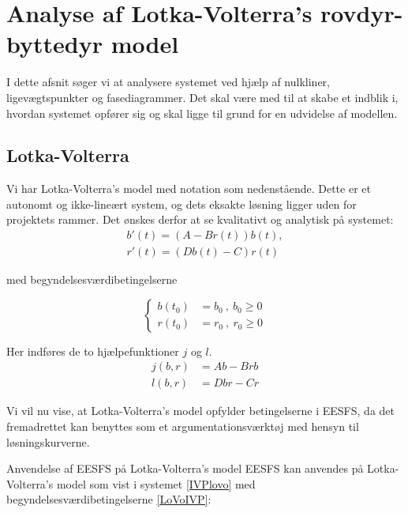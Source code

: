 \chapter{Analyse af Lotka-Volterra's rovdyr-byttedyr model}
I dette afsnit søger vi at analysere systemet ved hjælp af nulkliner, ligevægtspunkter og fasediagrammer. Det skal være med til at skabe et indblik i, hvordan systemet opfører sig og skal ligge til grund for en udvidelse af modellen.\\
\section{Lotka-Volterra}
Vi har Lotka-Volterra's model med notation som nedenstående. Dette er et autonomt og ikke-lineært system, og dets eksakte løsning ligger uden for projektets rammer. Det ønskes derfor at se kvalitativt og analytisk på systemet:
\begin{equation}
    \begin{aligned}
    b'(t) = (A-Br(t)) b(t),\\
    r'(t) = (Db(t)-C) r(t)
    \end{aligned}
    \label{IVPlovo}
\end{equation}

med begyndelsesværdibetingelserne

\begin{equation}\label{LoVoIVP}
    \begin{cases}
    b(t_0)&= b_0 \ , \ b_0\geq0\\
    r(t_0)&= r_0 \ , \ r_0\geq0
    \end{cases}
\end{equation}

Her indføres de to hjælpefunktioner $j$ og $l$. 
\begin{align}
    j(b,r) &= Ab - Brb\label{bytteh}\\
    l(b,r) &= Dbr - Cr
    \label{rovh}
\end{align}

Vi vil nu vise, at Lotka-Volterra's model opfylder betingelserne i EESFS, da det fremadrettet kan benyttes som et argumentationsværktøj med hensyn til løsningskurverne.
\begin{lemma}{Anvendelse af EESFS på Lotka-Volterra's model}{}
EESFS kan anvendes på Lotka-Volterra's model som vist i systemet \eqref{IVPlovo} med begyndelsesværdibetingelserne \eqref{LoVoIVP}:
\end{lemma}

